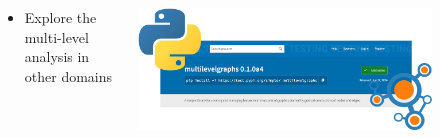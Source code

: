 \begin{minipage}[t]{\textwidth}
    \begin{columns}
        \begin{column}{0.5\textwidth}
        \begin{itemize}
            \item Explore the multi-level analysis in other domains
        \end{itemize}
        \end{column}
    \begin{column}{0.5\textwidth}
        \centering
        \includegraphics[width=0.8\textwidth]{immagini/pypi}
    \end{column}
\end{columns}
\end{minipage}